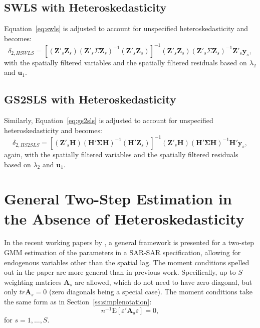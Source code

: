 \documentclass{article}
\begin{document}
\subsection{SWLS with Heteroskedasticity}
Equation~\ref{eq:swls} is adjusted to account for unspecified heteroskedasticity
and becomes:
\begin{equation*}
\delta_{2,HSWLS} =  [ ( \mathbf{Z'}_s \mathbf{Z}_s ) ( \mathbf{Z'}_s \Sigma \mathbf{Z}_s )^{-1}
 ( \mathbf{Z'}_s \mathbf{Z}_s) ]^{-1} ( \mathbf{Z'}_s \mathbf{Z}_s )  ( \mathbf{Z'}_s \Sigma \mathbf{Z}_s )^{-1} \mathbf{Z'}_s \mathbf{y}_s,
\end{equation*}
with the spatially filtered variables and the spatially filtered residuals based on $\lambda_2$
and $\mathbf{u}_1$.

\subsection{GS2SLS with Heteroskedasticity}
Similarly, Equation~\ref{eq:gs2sls} is adjusted to account for unspecified heteroskedasticity
and becomes:
\begin{equation*}
\delta_{2,HS2SLS} = [ ( \mathbf{Z'}_s \mathbf{H} )(\mathbf{H' \Sigma H})^{-1} ( \mathbf{H'} \mathbf{Z}_s ) ]^{-1} ( \mathbf{Z'}_s \mathbf{H} ) (\mathbf{H' \Sigma H})^{-1} \mathbf{H'} \mathbf{y}_s,
\end{equation*}
again, with the spatially filtered variables and the spatially filtered residuals based on $\lambda_2$
and $\mathbf{u}_1$.

\section{General Two-Step Estimation in the Absence of Heteroskedasticity}
In the recent working papers by \cite{Drukkeretal:10,Drukkeretal:11}, a general framework is presented
for a two-step GMM estimation of the parameters in a SAR-SAR specification, allowing
for endogenous variables other than the spatial lag. The moment conditions spelled out in the
paper are more general than in previous work.
Specifically, up to $S$ weighting matrices $\mathbf{A}_s$ are allowed, which do not need
to have zero diagonal, but only $tr \mathbf{A}_s = 0$ (zero diagonals being a special
case). The moment conditions take the same form as in Section~\ref{ss:simplenotation}:
\begin{equation}\label{eq:generalmomenteq}
 n^{-1} \mbox{E}[\varepsilon' \mathbf{A_s} \varepsilon ] = 0,
\end{equation}
for $s = 1, \dots, S$.
 
\end{document}
